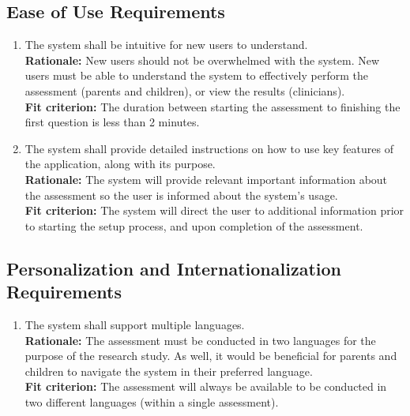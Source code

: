 \documentclass[12pt]{article}
\begin{document}
\subsection{Ease of Use Requirements} 
\begin{enumerate}[label={UH-EOU\arabic*}. ]
  \item The system shall be intuitive for new users to understand.\\
  \textbf{Rationale: }New users should not be overwhelmed with the system. New users must be able to understand the system to effectively perform the assessment (parents and children), or view the results (clinicians).\\
  \textbf{Fit criterion: }The duration between starting the assessment to finishing the first question is less than 2 minutes.
  \item The system shall provide detailed instructions on how to use key features of the application, along with its purpose.\\
  \textbf{Rationale: }The system will provide relevant important information about the assessment so the user is informed about the system's usage.\\ 
  \textbf{Fit criterion: }The system will direct the user to additional information prior to starting the setup process, and upon completion of the assessment.
\end{enumerate}
\subsection{Personalization and Internationalization Requirements}
\begin{enumerate}[label={UH-PI\arabic*}. ]
  \item The system shall support multiple languages.\\
  \textbf{Rationale: }The assessment must be conducted in two languages for the purpose of the research study. As well, it would be beneficial for parents and children to navigate the system in their preferred language.\\
  \textbf{Fit criterion: }The assessment will always be available to be conducted in two different languages (within a single assessment).
\end{enumerate}
\end{document}
